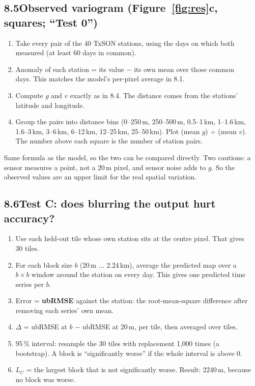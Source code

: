 \documentclass[11pt,a4paper]{article}
\begin{document}
\subsection*{8.5\quad Observed variogram (Figure~\ref{fig:res}c, squares; ``Test 0'')}
\begin{enumerate}
\item Take every pair of the 40 TxSON stations, using the days on which both measured (at least 60 days in common).
\item Anomaly of each station = its value $-$ its own mean over those common days. This matches the model's per-pixel average in 8.1.
\item Compute $g$ and $v$ exactly as in 8.4. The distance comes from the stations' latitude and longitude.
\item Group the pairs into distance bins (0--250\,m, 250--500\,m, 0.5--1\,km, 1--1.6\,km, 1.6--3\,km, 3--6\,km, 6--12\,km,
      12--25\,km, 25--50\,km). Plot (mean $g$) $\div$ (mean $v$). The number above each square is the number of station pairs.
\end{enumerate}
Same formula as the model, so the two can be compared directly. Two cautions: a sensor measures a point, not a 20\,m
pixel, and sensor noise adds to $g$. So the observed values are an upper limit for the real spatial variation.

\subsection*{8.6\quad Test C: does blurring the output hurt accuracy?}
\begin{enumerate}
\item Use each held-out tile whose own station sits at the centre pixel. That gives 30 tiles.
\item For each block size $b$ (20\,m $\ldots$ 2.24\,km), average the predicted map over a $b \times b$ window around the
      station on every day. This gives one predicted time series per $b$.
\item Error = \textbf{ubRMSE} against the station: the root-mean-square difference after removing each series' own mean.
\item $\Delta$ = ubRMSE at $b$ $-$ ubRMSE at 20\,m, per tile, then averaged over tiles.
\item 95\,\% interval: resample the 30 tiles with replacement 1{,}000 times (a bootstrap). A block is
      ``significantly worse'' if the whole interval is above 0.
\item $L_C$ = the largest block that is not significantly worse. Result: 2240\,m, because no block was worse.
\end{enumerate}
\end{document}
